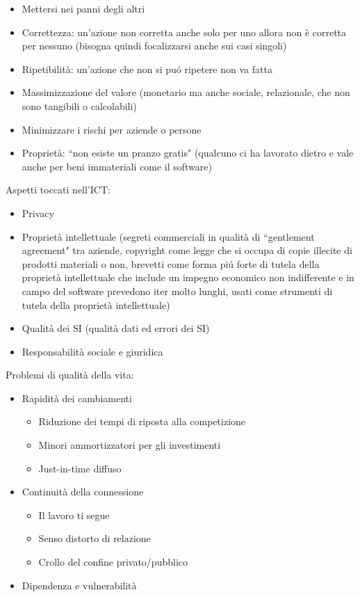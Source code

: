 \begin{itemize}

\item
  Mettersi nei panni degli altri
\item
  Correttezza: un'azione non corretta anche solo per uno allora non \`e
  corretta per nessuno (bisogna quindi focalizzarsi anche sui casi
  singoli)
\item
  Ripetibilit\`a: un'azione che non si pu\'o ripetere non va fatta
\item
  Massimizzazione del valore (monetario ma anche sociale, relazionale,
  che non sono tangibili o calcolabili)
\item
  Minimizzare i rischi per aziende o persone
\item
  Propriet\`a: ``non esiste un pranzo gratis" (qualcuno ci ha lavorato
  dietro e vale anche per beni immateriali come il software)
\end{itemize}

Aspetti toccati nell'ICT:

\begin{itemize}

\item
  Privacy
\item
  Propriet\`a intellettuale (segreti commerciali in qualit\`a di
  ``gentlement agreement" tra aziende, copyright come legge che si
  occupa di copie illecite di prodotti materiali o non, brevetti come
  forma pi\'u forte di tutela della propriet\`a intellettuale che include un
  impegno economico non indifferente e in campo del software prevedono
  iter molto lunghi, usati come strumenti di tutela della propriet\`a
  intellettuale)
\item
  Qualit\`a dei SI (qualit\`a dati ed errori dei SI)
\item
  Responsabilit\`a sociale e giuridica
\end{itemize}

Problemi di qualit\`a della vita:

\begin{itemize}

\item
  Rapidit\`a dei cambiamenti
  
  \begin{itemize}
    \item 
      Riduzione dei tempi di riposta alla competizione
    \item 
      Minori ammortizzatori per gli investimenti
    \item
      Just-in-time diffuso
  \end{itemize}
\item
  Continuità della connessione
  \begin{itemize}
    
    \item 
      Il lavoro ti segue
    \item 
      Senso distorto di relazione
    \item 
      Crollo del confine privato/pubblico
  \end{itemize}
\item
  Dipendenza e vulnerabilit\`a
\end{itemize}


